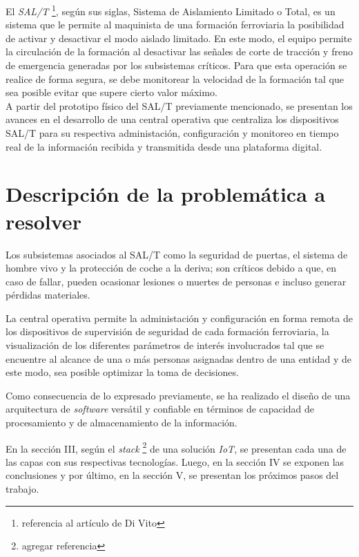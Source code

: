\documentclass[a4paper]{IEEEtran}
\begin{document}
El \textit{SAL/T} \cite{b1} \footnote{referencia al artículo de Di Vito}, según sus siglas, Sistema de Aislamiento Limitado o Total, es un sistema que le permite al maquinista de una formación ferroviaria la posibilidad de activar y desactivar el modo aislado limitado. En este modo, el equipo permite la circulación de la formación al desactivar las señales de corte de tracción y freno de emergencia generadas por los subsistemas críticos. Para que esta operación se realice de forma segura, se debe monitorear la velocidad de la formación tal que sea posible evitar que supere cierto valor máximo.\\

A partir del prototipo físico del SAL/T previamente mencionado, se presentan los avances en el desarrollo de una central operativa que centraliza los dispositivos SAL/T para su respectiva administación, configuración y monitoreo en tiempo real de la información recibida y transmitida desde una plataforma digital.


\section{Descripción de la problemática a resolver}

Los subsistemas asociados al SAL/T como la seguridad de puertas, el sistema de hombre vivo y la protección de coche a la deriva; son críticos debido a que, en caso de fallar, pueden ocasionar lesiones o muertes de personas e incluso generar pérdidas materiales. 

La central operativa permite la administación y configuración en forma remota de los dispositivos de supervisión de seguridad de cada formación ferroviaria, la visualización de los diferentes parámetros de interés involucrados tal que se encuentre al alcance de una o más personas asignadas dentro de una entidad y de este modo, sea posible optimizar la toma de decisiones.

Como consecuencia de lo expresado previamente, se ha realizado el diseño de una arquitectura de \textit{software} versátil y confiable en términos de capacidad de procesamiento y de almacenamiento de la información.

En la sección III, según el \textit{stack} \cite{b2} \footnote{agregar referencia} de una solución \textit{IoT}, se presentan cada una de las capas con sus respectivas tecnologías. Luego, en la sección IV se exponen las conclusiones y por último, en la sección V, se presentan los próximos pasos del trabajo.
\end{document}
